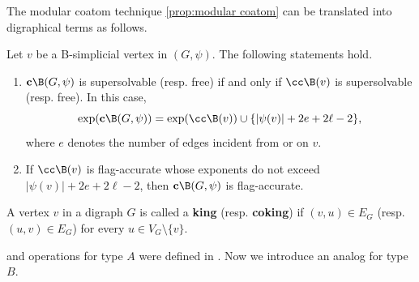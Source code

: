 The modular coatom technique \ref{prop:modular coatom} can be translated into digraphical terms as follows.
\begin{proposition}
\label{prop:B-simplicial}
Let $ v $ be a B-simplicial vertex in $ (G,\psi) $. 
The following statements hold. 
\begin{enumerate}[(1)]
\item[(i)]   $ \mathbf{c}\B(G,\psi) $ is supersolvable (resp. free) if and only if $\cc\B(v)$ is supersolvable (resp.  free). 
In this case, 
$$\exp ( \mathbf{c}\B(G,\psi)  )   = \exp  (\cc\B(v)  )  \cup \{|\psi(v)|+2e+2\ell-2\},$$ where  $ e $ denotes the number of edges incident from or on $ v $.
\item[(ii)]  If $\cc\B(v)$ is  flag-accurate whose exponents do not exceed  $|\psi(v)|+2e+2\ell-2$, then $ \mathbf{c}\B(G,\psi) $ is  flag-accurate.
\end{enumerate}
\end{proposition}





\begin{definition}
A vertex $ v $ in a digraph $ G $ is called a \textbf{king} (resp. \textbf{coking}) if $ (v,u) \in E_{G} $ (resp. $ (u,v) \in E_{G} $) for every $ u \in V_{G}\setminus\{v\} $. 
\end{definition}

  and  operations for type $A$ were defined in \cite[Definition 2.14]{ATT24}.
Now we introduce an analog for type $B$. 

